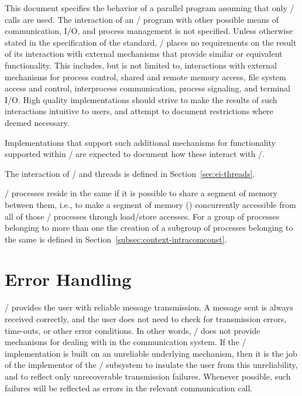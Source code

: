 This document specifies the behavior of a parallel program assuming
that only \MPI/ calls are used.  The interaction of
an \MPI/ program with other possible means of communication, I/O, and
process management is not specified.
Unless otherwise stated in the specification of the standard, \MPI/ places
no requirements on the result of its interaction with external mechanisms
that provide similar or equivalent functionality.  This includes, but is
not limited to, interactions with external mechanisms for process
control, shared and remote memory access, file system access and control,
interprocess communication, process signaling, and terminal I/O.
High quality implementations should strive to make the results of such
interactions intuitive to users, and attempt to document restrictions
where deemed necessary.

\begin{implementors}
Implementations that support such additional mechanisms for
functionality supported within \mpi/ are expected to document how
these interact with \mpi/.
\end{implementors}

The interaction of \mpi/ and threads is defined in
Section~\ref{sec:ei-threads}.

\MPI/ processes reside in the same 
if it is possible to share a segment of memory between them, i.e., to make a segment of memory
()
concurrently accessible from all of those \MPI/ processes through load/store accesses.
For a group of processes belonging to more than one  the creation of a subgroup of processes belonging to the same  is defined in Section~\ref{subsec:context-intracomconst}.



\section{Error Handling}
\label{sec:terms-errorhandling}

\MPI/ provides the user with reliable message transmission.
A message sent is always received
correctly, and the user does not need to check for transmission errors,
time-outs, or other error conditions.  In
other words, \MPI/ does not provide mechanisms for
dealing with 
in the communication system.
If the \MPI/ implementation is built on an unreliable underlying
mechanism, then it is the job of the implementor of the \MPI/ subsystem
to insulate the user from this unreliability, and to reflect only unrecoverable
transmission failures.
Whenever possible, such failures will be reflected as errors in the relevant
communication call.

